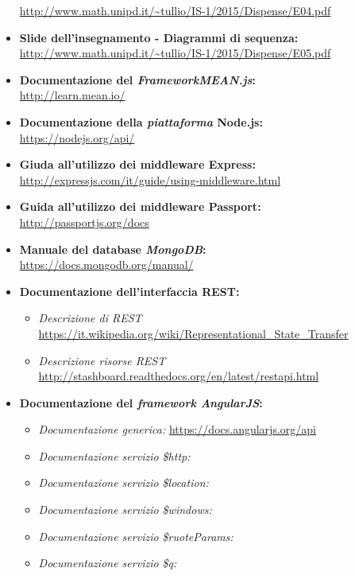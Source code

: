 \begin{itemize}
		\url{http://www.math.unipd.it/~tullio/IS-1/2015/Dispense/E04.pdf}
	\item \textbf{Slide dell'insegnamento - Diagrammi di sequenza:} \\
		\url{http://www.math.unipd.it/~tullio/IS-1/2015/Dispense/E05.pdf}
	\item \textbf{Documentazione del \textit{FrameworkMEAN.js}:} \\
		\url{http://learn.mean.io/}
	\item \textbf{Documentazione della \textit{piattaforma} Node.js:} \\
		\url{https://nodejs.org/api/}
	\item \textbf{Giuda all'utilizzo dei middleware Express:} \\
		\url{http://expressjs.com/it/guide/using-middleware.html}
	\item \textbf{Guida all'utilizzo dei middleware Passport:} \\
		\url{http://passportjs.org/docs}
	\item \textbf{Manuale del database \textit{MongoDB}:} \\
		\url{https://docs.mongodb.org/manual/}
	\item \textbf{Documentazione dell'interfaccia REST:}
		\begin{itemize}
			\item \textit{Descrizione di REST} \url{https://it.wikipedia.org/wiki/Representational_State_Transfer}
			\item \textit{Descrizione risorse REST} \url{http://stashboard.readthedocs.org/en/latest/restapi.html}
		\end{itemize}
	\item \textbf{Documentazione del \textit{framework AngularJS}:} \\
		\begin{itemize}
			\item \textit{Documentazione generica:} \url{https://docs.angularjs.org/api}
			\item \textit{Documentazione servizio \$http:} \url{}
			\item \textit{Documentazione servizio \$location:} \url{}
			\item \textit{Documentazione servizio \$windows:} \url{}
			\item \textit{Documentazione servizio \$ruoteParams:} \url{}
			\item \textit{Documentazione servizio \$q:} \url{}
		\end{itemize}

\end{itemize}
